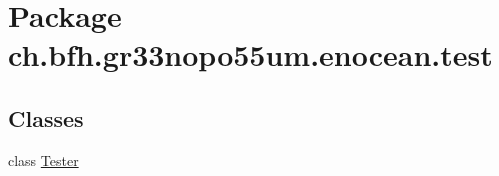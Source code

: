 \hypertarget{namespacech_1_1bfh_1_1gr33nopo55um_1_1enocean_1_1test}{}\section{Package ch.\+bfh.\+gr33nopo55um.\+enocean.\+test}
\label{namespacech_1_1bfh_1_1gr33nopo55um_1_1enocean_1_1test}
\subsection*{Classes}
\begin{DoxyCompactItemize}
\item 
class \hyperlink{classch_1_1bfh_1_1gr33nopo55um_1_1enocean_1_1test_1_1_tester}{Tester}
\end{DoxyCompactItemize}
